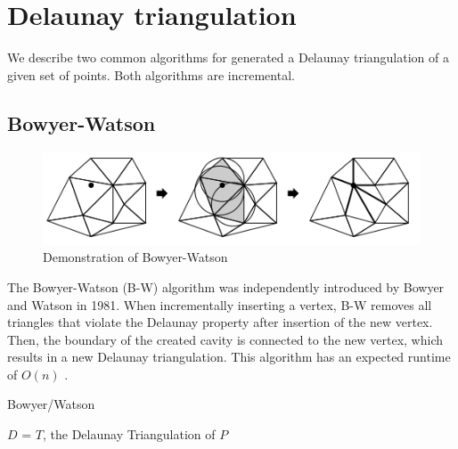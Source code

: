 \section{Delaunay triangulation}
\label{sec:triangulation}

We describe two common algorithms for generated a Delaunay triangulation of a given set of points.
Both algorithms are incremental.

\subsection{Bowyer-Watson}
\label{sub:bowyer_watson}

\begin{figure}
    \includegraphics[width=\columnwidth]{../images/BW.png}
    \caption{Demonstration of Bowyer-Watson}
\end{figure}

The Bowyer-Watson (B-W) algorithm was independently introduced by Bowyer \cite{art:Bowyer1981} and Watson \cite{art:Watson1981} in 1981.
When incrementally inserting a vertex, B-W removes all triangles that violate the Delaunay property after insertion of the new vertex.
Then, the boundary of the created cavity is connected to the new vertex, which results in a new Delaunay triangulation.
This algorithm has an expected runtime of $O(n)$ \cite{shewchuk}.

\begin{algorithm}
    \caption{Bowyer/Watson}
    \begin{algorithmic}
            \EndFor
            \Return $D$ = $T$, the Delaunay Triangulation of $P$
        \EndFunction
    \end{algorithmic}
\end{algorithm}

